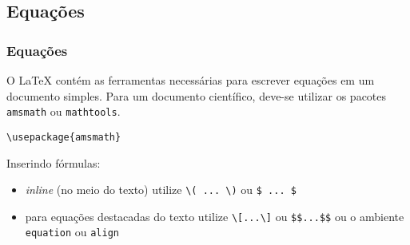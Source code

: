 \subsection{Equações}
\begin{frame}[fragile]
\frametitle{Equações}
O \LaTeX{} contém as ferramentas necessárias para escrever equações em um documento simples.
Para um documento científico, deve-se utilizar os pacotes \texttt{amsmath} ou \texttt{mathtools}.

\begin{verbatim}
\usepackage{amsmath}
\end{verbatim}

Inserindo fórmulas:
  \begin{itemize}
  \item \emph{inline} (no meio do texto) utilize \verb|\( ... \)| ou \verb|$ ... $|
  \item para equações destacadas do texto utilize \verb|\[...\]| ou \verb|$$...$$| ou o ambiente \texttt{equation} ou \texttt{align}
  \end{itemize}
\end{frame}

